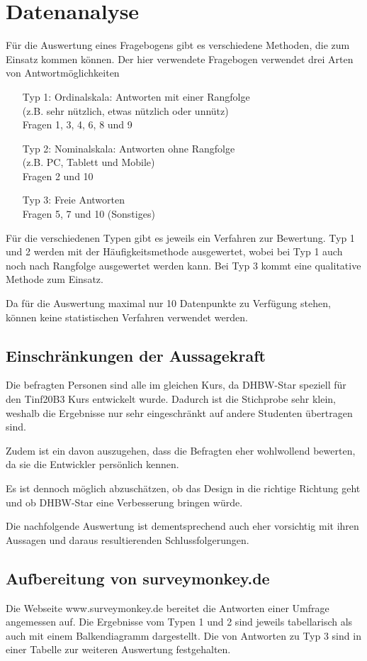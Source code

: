 \chapter{Datenanalyse}
Für die Auswertung eines Fragebogens gibt es verschiedene Methoden, die zum Einsatz kommen können. Der hier verwendete Fragebogen verwendet drei Arten von Antwortmöglichkeiten
\begin{itemize}
	\item[Typ 1:] {Ordinalskala: Antworten mit einer Rangfolge \\
		(z.B. sehr nützlich, etwas nützlich oder unnütz) \\
		Fragen 1, 3, 4, 6, 8 und 9}
	\item[Typ 2:] {Nominalskala: Antworten ohne Rangfolge \\
		(z.B. PC, Tablett und Mobile) \\
		Fragen 2 und 10}
	\item[Typ 3:] {Freie Antworten \\
		Fragen 5, 7 und 10 (Sonstiges) }
\end{itemize}
Für die verschiedenen Typen gibt es jeweils ein Verfahren zur Bewertung.
Typ 1 und 2 werden mit der Häufigkeitsmethode ausgewertet, wobei bei Typ 1 auch noch nach Rangfolge ausgewertet werden kann. Bei Typ 3 kommt eine qualitative Methode zum Einsatz.

Da für die Auswertung maximal nur 10 Datenpunkte zu Verfügung stehen, können keine statistischen Verfahren verwendet werden.
\newpage
\section{Einschränkungen der Aussagekraft }
Die befragten Personen sind alle im gleichen Kurs, da DHBW-Star speziell für den Tinf20B3 Kurs entwickelt wurde. Dadurch ist die Stichprobe sehr klein, weshalb die Ergebnisse nur sehr eingeschränkt auf andere Studenten übertragen sind.


Zudem ist ein davon auszugehen, dass die Befragten eher wohlwollend bewerten, da sie die Entwickler persönlich kennen.

Es ist dennoch möglich abzuschätzen, ob das Design in die richtige Richtung geht und ob DHBW-Star eine Verbesserung bringen würde.

Die nachfolgende Auswertung ist dementsprechend auch eher vorsichtig mit ihren Aussagen und daraus resultierenden Schlussfolgerungen.

\section{Aufbereitung von surveymonkey.de}
Die Webseite www.surveymonkey.de bereitet die Antworten einer Umfrage angemessen auf. Die Ergebnisse vom Typen 1 und 2 sind jeweils tabellarisch als auch mit einem Balkendiagramm dargestellt.
Die von Antworten zu Typ 3 sind in einer Tabelle zur weiteren Auswertung festgehalten.

